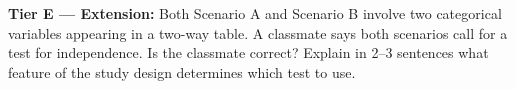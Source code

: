 \documentclass[10pt]{article}
\begin{document}
\vspace{0.08in}

\begin{extensionbox}
\textbf{Tier E --- Extension:} Both Scenario A and Scenario B involve two categorical
variables appearing in a two-way table. A classmate says both scenarios call for a test
for independence. Is the classmate correct? Explain in 2--3 sentences what feature of
the study design determines which test to use.
\end{extensionbox}
\end{document}

